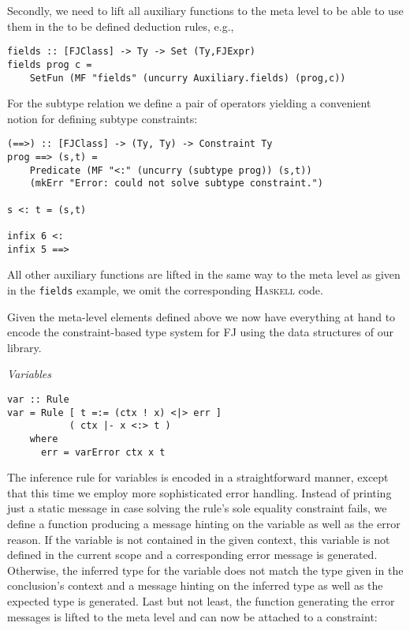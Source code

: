 Secondly, we need to lift all auxiliary functions to the meta level to
be able to use them in the to be defined deduction rules, e.g.,

\begin{lstlisting}
fields :: [FJClass] -> Ty -> Set (Ty,FJExpr)
fields prog c =
    SetFun (MF "fields" (uncurry Auxiliary.fields) (prog,c))
\end{lstlisting}

For the subtype relation we define a pair of operators yielding a
convenient notion for defining subtype constraints:

\begin{lstlisting}
(==>) :: [FJClass] -> (Ty, Ty) -> Constraint Ty
prog ==> (s,t) =
    Predicate (MF "<:" (uncurry (subtype prog)) (s,t))
    (mkErr "Error: could not solve subtype constraint.")

s <: t = (s,t)

infix 6 <:
infix 5 ==>
\end{lstlisting}

All other auxiliary functions are lifted in the same way to the
meta level as given in the \texttt{fields} example, we omit the
corresponding \textsc{Haskell} code.

Given the meta-level elements defined above we now have everything at
hand to encode the constraint-based type system for \textsc{FJ} using
the data structures of our library.

\bigskip\textit{Variables}

\begin{lstlisting}
var :: Rule
var = Rule [ t =:= (ctx ! x) <|> err ]
           ( ctx |- x <:> t )
    where
      err = varError ctx x t
\end{lstlisting}

The inference rule for variables is encoded in a straightforward
manner, except that this time we employ more sophisticated error
handling. Instead of printing just a static message in case solving
the rule's sole equality constraint fails, we define a function
producing a message hinting on the variable as well as the error
reason. If the variable is not contained in the given context, this
variable is not defined in the current scope and a corresponding error
message is generated. Otherwise, the inferred type for the variable
does not match the type given in the conclusion's context and a
message hinting on the inferred type as well as the expected type is
generated. Last but not least, the function generating the error
messages is lifted to the meta level and can now be attached to a
constraint:


